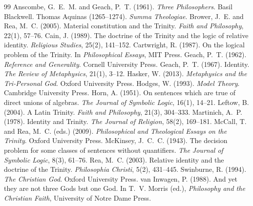 \documentclass{situationist-preprint}
\begin{document}
\begin{thebibliography}{99}\small
{} Anscombe, G.~E.~M. and Geach, P.~T. (1961). \emph{Three Philosophers}. Basil Blackwell.
 Thomas Aquinas (1265--1274). \emph{Summa Theologiae}.
 Brower, J.~E. and Rea, M.~C. (2005). Material constitution and the Trinity. \emph{Faith and Philosophy}, 22(1), 57--76.
 Cain, J. (1989). The doctrine of the Trinity and the logic of relative identity. \emph{Religious Studies}, 25(2), 141--152.
 Cartwright, R. (1987). On the logical problem of the Trinity. In \emph{Philosophical Essays}, MIT Press.
 Geach, P.~T. (1962). \emph{Reference and Generality}. Cornell University Press.
 Geach, P.~T. (1967). Identity. \emph{The Review of Metaphysics}, 21(1), 3--12.
 Hasker, W. (2013). \emph{Metaphysics and the Tri-Personal God}. Oxford University Press.
 Hodges, W. (1993). \emph{Model Theory}. Cambridge University Press.
 Horn, A. (1951). On sentences which are true of direct unions of algebras. \emph{The Journal of Symbolic Logic}, 16(1), 14--21.
 Leftow, B. (2004). A Latin Trinity. \emph{Faith and Philosophy}, 21(3), 304--333.
 Martinich, A.~P. (1978). Identity and Trinity. \emph{The Journal of Religion}, 58(2), 169--181.
 McCall, T. and Rea, M.~C. (eds.) (2009). \emph{Philosophical and Theological Essays on the Trinity}. Oxford University Press.
 McKinsey, J.~C.~C. (1943). The decision problem for some classes of sentences without quantifiers. \emph{The Journal of Symbolic Logic}, 8(3), 61--76.
 Rea, M.~C. (2003). Relative identity and the doctrine of the Trinity. \emph{Philosophia Christi}, 5(2), 431--445.
 Swinburne, R. (1994). \emph{The Christian God}. Oxford University Press.
 van Inwagen, P. (1988). And yet they are not three Gods but one God. In T.~V. Morris (ed.), \emph{Philosophy and the Christian Faith}, University of Notre Dame Press.
\end{thebibliography}
\end{document}
